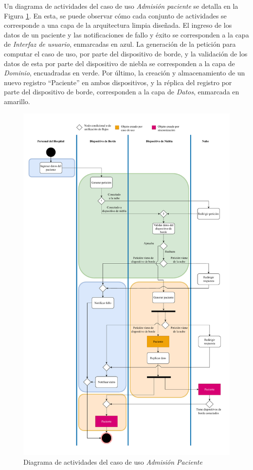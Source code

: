 Un diagrama de actividades del caso de uso \textit{Admisión paciente} se detalla en la Figura \ref{fig:diagActAdmPaciente}. En esta, se puede observar cómo cada conjunto de actividades se corresponde a una capa de la arquitectura limpia diseñada. El ingreso de los datos de un paciente y las notificaciones de fallo y éxito se corresponden a la capa de \textit{Interfaz de usuario}, enmarcadas en azul. La generación de la petición para computar el caso de uso, por parte del dispositivo de borde, y la validación de los datos de esta por parte del dispositivo de niebla se corresponden a la capa de \textit{Dominio}, encuadradas en verde. Por último, la creación y almacenamiento de un nuevo registro ``Paciente'' en ambos dispositivos, y la réplica del registro por parte del dispositivo de borde, corresponden a la capa de \textit{Datos}, enmarcada en amarillo.

\begin{figure}
    \centering
    \includegraphics[width=\textwidth, height=\textheight, keepaspectratio]{Imagenes/Implementacion/DetalladoIngresarPaciente.pdf}
    \caption{Diagrama de actividades del caso de uso \textit{Admisión Paciente}}
    \label{fig:diagActAdmPaciente}
\end{figure}

